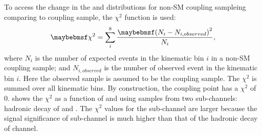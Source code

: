 To access the change in the \mhh and \HT distributions for  non-SM coupling sampleing comparing to \SM coupling sample, the $\chi^2$ function is used:
\begin{equation}
\chi^2 = \sum_{i}^{8}\frac{\parenths{N_i - N_{i,observed}}^2}{N_{i}},
\label{eqn:doubleHiggsChi2}
\end{equation}
where $N_i$ is the number of expected  events in the kinematic bin $i$ in a non-SM coupling sample; and $ N_{i,observed}$ is the number of observed  event in the kinematic bin $i$. Here the observed sample is assumed to be the \SM coupling sample. The  $\chi^2$  is summed over all kinematic bins. By construction, the \SM coupling point has a $\chi^2$ of 0.  shows the $\chi^2$  as a function of \gHHH and \gWWHH using samples from two sub-channels: hadronic \WW decay of \eeToHHbbWW and \eeToHHbbbb. The $\chi^2$ values for the \eeToHHbbbb sub-channel are larger because the signal significance of \eeToHHbbbb  sub-channel is much higher than that of the hadronic \WW decay of \eeToHHbbWW channel.



